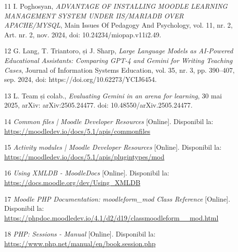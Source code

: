 \begin{itemize}
    \item [11] I. Poghosyan, \textit{ADVANTAGE OF INSTALLING MOODLE LEARNING MANAGEMENT SYSTEM UNDER IIS/MARIADB OVER APACHE/MYSQL}, Main Issues Of Pedagogy And Psychology, vol. 11, nr. 2, Art. nr. 2, nov. 2024, doi: 10.24234/miopap.v11i2.49.
    \item [12] G. Lang, T. Triantoro, și J. Sharp, \textit{Large Language Models as AI-Powered Educational Assistants: Comparing GPT-4 and Gemini for Writing Teaching Cases}, Journal of Information Systems Education, vol. 35, nr. 3, pp. 390–407, sep. 2024, doi: https://doi.org/10.62273/YCIJ6454.
    \item [13] L. Team și colab., \textit{Evaluating Gemini in an arena for learning}, 30 mai 2025, arXiv: arXiv:2505.24477. doi: 10.48550/arXiv.2505.24477.
    \item [14] \textit{Common files | Moodle Developer Resources} [Online]. Disponibil la: \url{https://moodledev.io/docs/5.1/apis/commonfiles}
    \item [15] \textit{Activity modules | Moodle Developer Resources} [Online]. Disponibil la: \url{https://moodledev.io/docs/5.1/apis/plugintypes/mod}
    \item [16] \textit{Using XMLDB - MoodleDocs} [Online]. Disponibil la: \url{https://docs.moodle.org/dev/Using\_XMLDB}
    \item [17] \textit{Moodle PHP Documentation: moodleform\_mod Class Reference} [Online]. Disponibil la: \url{https://phpdoc.moodledev.io/4.1/d2/d19/classmoodleform\__mod.html}
    \item [18] \textit{PHP: Sessions - Manual} [Online]. Disponibil la: \url{https://www.php.net/manual/en/book.session.php}

\end{itemize}